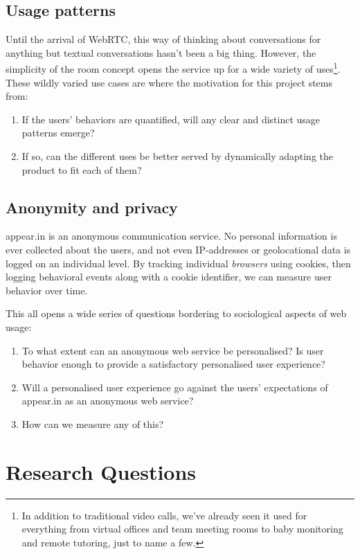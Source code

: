 \subsection{Usage patterns}

Until the arrival of WebRTC, this way of thinking about conversations for anything but textual conversations hasn't been a big thing. However, the simplicity of the room concept opens the service up for a wide variety of uses\footnote{In addition to traditional video calls, we've already seen it used for everything from virtual offices and team meeting rooms to baby monitoring and remote tutoring, just to name a few.}. These wildly varied use cases are where the motivation for this project stems from:

\begin{enumerate}
  \item If the users' behaviors are quantified, will any clear and distinct usage patterns emerge?
  \item If so, can the different uses be better served by dynamically adapting the product to fit each of them?
\end{enumerate}

\subsection{Anonymity and privacy}

appear.in is an anonymous communication service. No personal information is ever collected about the users, and not even IP-addresses or geolocational data is logged on an individual level. By tracking individual \emph{browsers} using cookies, then logging behavioral events along with a cookie identifier, we can measure user behavior over time.

This all opens a wide series of questions bordering to sociological aspects of web usage:

\begin{enumerate}
  \item
    To what extent can an anonymous web service be personalised?
    Is user behavior enough to provide a satisfactory personalised user experience?
  \item
    Will a personalised user experience go against the users' expectations of appear.in as an anonymous web service?
  \item
    How can we measure any of this?
\end{enumerate}

\section{Research Questions}
\label{sec:research_questions}

